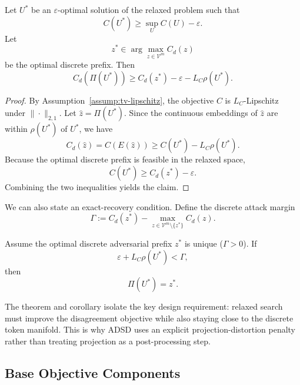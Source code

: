 \begin{theorem}
\label{thm:relax-gap}
Let $U^*$ be an $\varepsilon$-optimal solution of the relaxed problem such that
\[
C(U^*) \ge \sup_U C(U) - \varepsilon.
\]
Let
\[
z^* \in \arg\max_{z \in \mathcal{V}^m} C_d(z)
\]
be the optimal discrete prefix. Then
\[
C_d(\Pi(U^*)) \ge C_d(z^*) - \varepsilon - L_C \rho(U^*).
\]
\end{theorem}

\begin{proof}
By Assumption~\ref{assump:tv-lipschitz}, the objective $C$ is $L_C$-Lipschitz
under $\|\cdot\|_{2,1}$. Let $\hat{z} = \Pi(U^*)$. Since the continuous
embeddings of $\hat{z}$ are within $\rho(U^*)$ of $U^*$, we have
\[
C_d(\hat{z}) = C(E(\hat{z})) \ge C(U^*) - L_C \rho(U^*).
\]
Because the optimal discrete prefix is feasible in the relaxed space,
\[
C(U^*) \ge C_d(z^*) - \varepsilon.
\]
Combining the two inequalities yields the claim.
\end{proof}

We can also state an exact-recovery condition. Define the discrete attack
margin
\[
\Gamma := C_d(z^*) - \max_{z \in \mathcal{V}^m \setminus \{z^*\}} C_d(z).
\]

\begin{corollary}
\label{cor:exact-recovery}
Assume the optimal discrete adversarial prefix $z^*$ is unique
($\Gamma > 0$). If
\[
\varepsilon + L_C \rho(U^*) < \Gamma,
\]
then
\[
\Pi(U^*) = z^*.
\]
\end{corollary}

The theorem and corollary isolate the key design requirement: relaxed search
must improve the disagreement objective while also staying close to the
discrete token manifold. This is why ADSD uses an explicit
projection-distortion penalty rather than treating projection as a
post-processing step.

\subsection{Base Objective Components}

